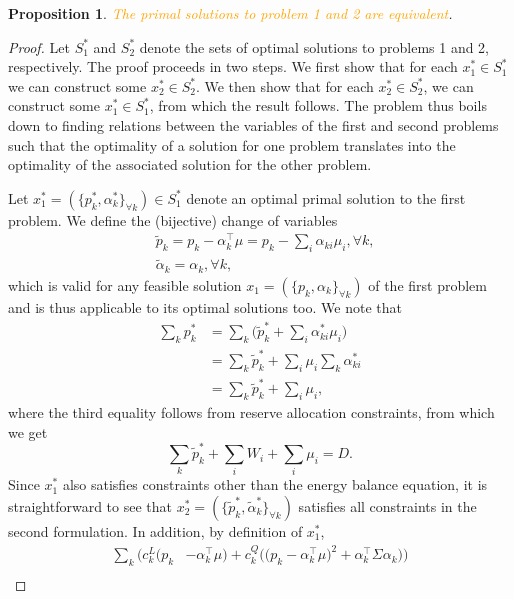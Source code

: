 \documentclass{article}
\newtheorem{proposition}{Proposition}
\begin{document}
\begin{proposition}
\textcolor{orange}{The primal solutions to problem 1 and 2 are equivalent}.
\end{proposition}
\begin{proof}
Let $S_1^*$ and $S_2^*$ denote the sets of optimal solutions to problems 1 and 2, respectively. The proof proceeds in two steps. We first show that for each $x_1^* \in S_1^*$ we can construct some $x_2^* \in S_2^*$. We then show that for each $x_2^* \in S_2^*$, we can construct some $x_1^* \in S_1^*$, from which the result follows. The problem thus boils down to finding relations between the variables of the first and second problems such that the optimality of a solution for one problem translates into the optimality of the associated solution for the other problem. 

Let $x_1^* = (\{p_k^*, \alpha_k^*\}_{\forall k}) \in S_1^*$ denote an optimal primal solution to the first problem. We define the (bijective) change of variables
\begin{align*}
&\tilde{p}_k = p_k - \alpha_k^\top \mu = p_k - \sum_i \alpha_{ki} \mu_i, \forall k,\\
&\tilde{\alpha}_k = \alpha_k, \forall k,
\end{align*}
which is valid for any feasible solution $x_1 = (\{p_k, \alpha_k\}_{\forall k})$ of the first problem and is thus applicable to its optimal solutions too. We note that
\begin{align*}
\sum_k p_k^* &= \sum_k \Big(\tilde{p}_k^* + \sum_i \alpha_{ki}^* \mu_i\Big)\\
&= \sum_k \tilde{p}_k^* + \sum_i \mu_i \sum_k \alpha_{ki}^*\\
&= \sum_k \tilde{p}_k^* + \sum_i \mu_i,
\end{align*}
where the third equality follows from reserve allocation constraints, from which we get 
\begin{equation*}
\sum_k \tilde{p}_k^* + \sum_i W_i + \sum_i \mu_i = D. 
\end{equation*}
Since $x_1^*$ also satisfies constraints other than the energy balance equation, it is straightforward to see that $x_2^* = (\{\tilde{p}_k^*, \tilde{\alpha}_k^*\}_{\forall k})$ satisfies all constraints in the second formulation. In addition, by definition of $x_1^*$,
\begin{align*}
\sum_k \Big(c_k^L\big(p_k &- \alpha_k^\top \mu\big) + c_k^Q \Big(\big(p_k - \alpha_{k}^\top \mu \big)^2 + \alpha_k^\top \Sigma \alpha_k\Big)\Big)\\

\end{align*}
\end{proof}
\end{document}
